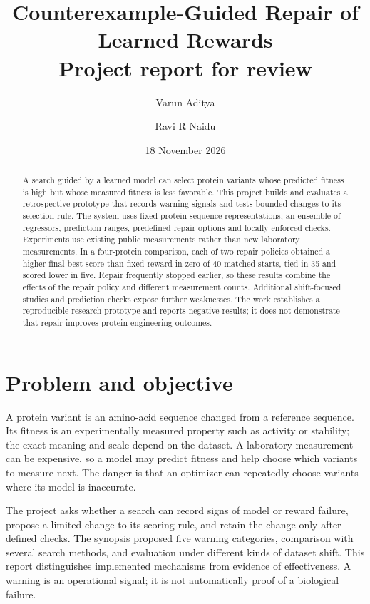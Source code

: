 \documentclass[11pt,a4paper]{article}
\title{Counterexample-Guided Repair of Learned Rewards\\\large Project report for review}
\author{Varun Aditya \and Ravi R Naidu}
\date{18 November 2026}
\begin{document}
\maketitle
\begin{abstract}
A search guided by a learned model can select protein variants whose predicted fitness is high but whose measured fitness is less favorable. This project builds and evaluates a retrospective prototype that records warning signals and tests bounded changes to its selection rule. The system uses fixed protein-sequence representations, an ensemble of regressors, prediction ranges, predefined repair options and locally enforced checks. Experiments use existing public measurements rather than new laboratory measurements. In a four-protein comparison, each of two repair policies obtained a higher final best score than fixed reward in zero of 40 matched starts, tied in 35 and scored lower in five. Repair frequently stopped earlier, so these results combine the effects of the repair policy and different measurement counts. Additional shift-focused studies and prediction checks expose further weaknesses. The work establishes a reproducible research prototype and reports negative results; it does not demonstrate that repair improves protein engineering outcomes.
\end{abstract}
\setcounter{tocdepth}{1}
\begingroup\small\tableofcontents\endgroup
\newpage
\section{Problem and objective}
A protein variant is an amino-acid sequence changed from a reference sequence. Its fitness is an experimentally measured property such as activity or stability; the exact meaning and scale depend on the dataset. A laboratory measurement can be expensive, so a model may predict fitness and help choose which variants to measure next. The danger is that an optimizer can repeatedly choose variants where its model is inaccurate.

The project asks whether a search can record signs of model or reward failure, propose a limited change to its scoring rule, and retain the change only after defined checks. The synopsis proposed five warning categories, comparison with several search methods, and evaluation under different kinds of dataset shift. This report distinguishes implemented mechanisms from evidence of effectiveness. A warning is an operational signal; it is not automatically proof of a biological failure.
\end{document}
